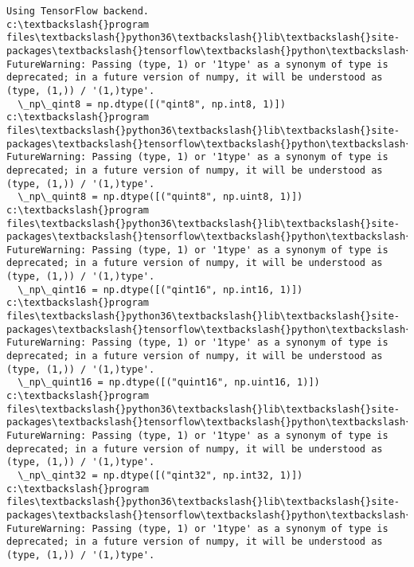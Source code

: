 \documentclass[11pt]{article}
\begin{document}
    \begin{Verbatim}[commandchars=\\\{\}]
Using TensorFlow backend.
c:\textbackslash{}program files\textbackslash{}python36\textbackslash{}lib\textbackslash{}site-packages\textbackslash{}tensorflow\textbackslash{}python\textbackslash{}framework\textbackslash{}dtypes.py:516: FutureWarning: Passing (type, 1) or '1type' as a synonym of type is deprecated; in a future version of numpy, it will be understood as (type, (1,)) / '(1,)type'.
  \_np\_qint8 = np.dtype([("qint8", np.int8, 1)])
c:\textbackslash{}program files\textbackslash{}python36\textbackslash{}lib\textbackslash{}site-packages\textbackslash{}tensorflow\textbackslash{}python\textbackslash{}framework\textbackslash{}dtypes.py:517: FutureWarning: Passing (type, 1) or '1type' as a synonym of type is deprecated; in a future version of numpy, it will be understood as (type, (1,)) / '(1,)type'.
  \_np\_quint8 = np.dtype([("quint8", np.uint8, 1)])
c:\textbackslash{}program files\textbackslash{}python36\textbackslash{}lib\textbackslash{}site-packages\textbackslash{}tensorflow\textbackslash{}python\textbackslash{}framework\textbackslash{}dtypes.py:518: FutureWarning: Passing (type, 1) or '1type' as a synonym of type is deprecated; in a future version of numpy, it will be understood as (type, (1,)) / '(1,)type'.
  \_np\_qint16 = np.dtype([("qint16", np.int16, 1)])
c:\textbackslash{}program files\textbackslash{}python36\textbackslash{}lib\textbackslash{}site-packages\textbackslash{}tensorflow\textbackslash{}python\textbackslash{}framework\textbackslash{}dtypes.py:519: FutureWarning: Passing (type, 1) or '1type' as a synonym of type is deprecated; in a future version of numpy, it will be understood as (type, (1,)) / '(1,)type'.
  \_np\_quint16 = np.dtype([("quint16", np.uint16, 1)])
c:\textbackslash{}program files\textbackslash{}python36\textbackslash{}lib\textbackslash{}site-packages\textbackslash{}tensorflow\textbackslash{}python\textbackslash{}framework\textbackslash{}dtypes.py:520: FutureWarning: Passing (type, 1) or '1type' as a synonym of type is deprecated; in a future version of numpy, it will be understood as (type, (1,)) / '(1,)type'.
  \_np\_qint32 = np.dtype([("qint32", np.int32, 1)])
c:\textbackslash{}program files\textbackslash{}python36\textbackslash{}lib\textbackslash{}site-packages\textbackslash{}tensorflow\textbackslash{}python\textbackslash{}framework\textbackslash{}dtypes.py:525: FutureWarning: Passing (type, 1) or '1type' as a synonym of type is deprecated; in a future version of numpy, it will be understood as (type, (1,)) / '(1,)type'.

\end{Verbatim}
\end{document}
